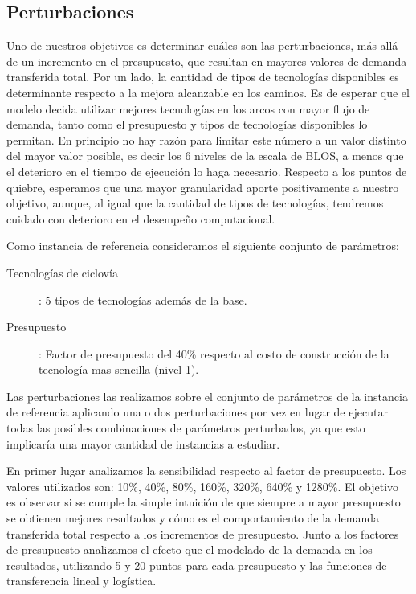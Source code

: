\FloatBarrier
\subsection{Perturbaciones}

Uno de nuestros objetivos es determinar cuáles son las perturbaciones, más allá de un incremento en el presupuesto, que resultan en mayores valores de demanda transferida total. Por un lado, la cantidad de tipos de tecnologías disponibles es determinante respecto a la mejora alcanzable en los caminos. Es de esperar que el modelo decida utilizar mejores tecnologías en los arcos con mayor flujo de demanda, tanto como el presupuesto y tipos de tecnologías disponibles lo permitan. En principio no hay razón para limitar este número a un valor distinto del mayor valor posible, es decir los 6 niveles de la escala de BLOS, a menos que el deterioro en el tiempo de ejecución lo haga necesario. Respecto a los puntos de quiebre, esperamos que una mayor granularidad aporte positivamente a nuestro objetivo, aunque, al igual que la cantidad de tipos de tecnologías, tendremos cuidado con deterioro en el desempeño computacional.

Como instancia de referencia consideramos el siguiente conjunto de parámetros:

\begin{description}
  \item[Tecnologías de ciclovía]: 5 tipos de tecnologías además de la base.
  \item[Presupuesto]: Factor de presupuesto del 40\% respecto al costo de construcción de la tecnología mas sencilla (nivel 1).
\end{description}

Las perturbaciones las realizamos sobre el conjunto de parámetros de la instancia de referencia aplicando una o dos perturbaciones por vez en lugar de ejecutar todas las posibles combinaciones de parámetros perturbados, ya que esto implicaría una mayor cantidad de instancias a estudiar.

En primer lugar analizamos la sensibilidad respecto al factor de presupuesto. Los valores utilizados son: 10\%, 40\%, 80\%, 160\%, 320\%, 640\% y 1280\%. El objetivo es observar si se cumple la simple intuición de que siempre a mayor presupuesto se obtienen mejores resultados y cómo es el comportamiento de la demanda transferida total respecto a los incrementos de presupuesto. Junto a los factores de presupuesto analizamos el efecto que el modelado de la demanda en los resultados, utilizando 5 y 20 puntos para cada presupuesto y las funciones de transferencia lineal y logística.

